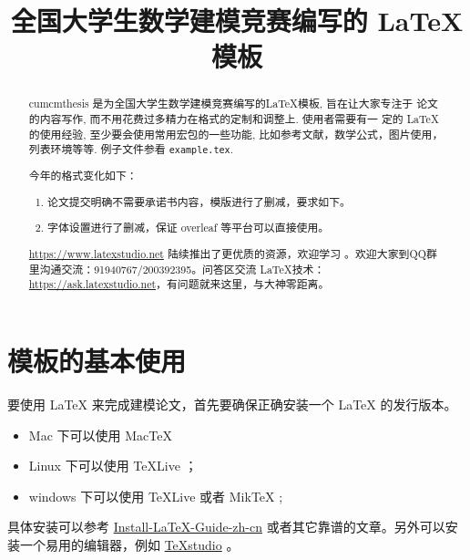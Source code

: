 \documentclass[withoutpreface,bwprint]{cumcmthesis} %
\title{全国大学生数学建模竞赛编写的 \LaTeX{} 模板}
\begin{document}
 \maketitle
 \begin{abstract}
cumcmthesis 是为全国大学生数学建模竞赛编写的\LaTeX{}模板, 旨在让大家专注于 论文的内容写作, 而不用花费过多精力在格式的定制和调整上.  使用者需要有一 定的 \LaTeX{} 的使用经验, 至少要会使用常用宏包的一些功能, 比如参考文献，数学公式，图片使用，列表环境等等. 例子文件参看 \texttt{example.tex}.

\begin{framee} 
 
今年的格式变化如下：
\begin{enumerate}
\item 论文提交明确不需要承诺书内容，模版进行了删减，要求如下。

\item 字体设置进行了删减，保证 overleaf 等平台可以直接使用。

\end{enumerate}

\end{framee}


\url{https://www.latexstudio.net} 陆续推出了更优质的资源，欢迎学习 。欢迎大家到QQ群里沟通交流：91940767/200392395。问答区交流 \LaTeX{}技术：\url{https://ask.latexstudio.net}，有问题就来这里，与大神零距离。

\end{abstract}



\section{模板的基本使用}

要使用 \LaTeX{} 来完成建模论文，首先要确保正确安装一个 \LaTeX{} 的发行版本。

\begin{itemize}
    \item Mac 下可以使用 Mac\TeX{}
    \item Linux 下可以使用 \TeX{}Live ；
    \item windows 下可以使用 \TeX{}Live 或者 Mik\TeX{} ;
\end{itemize}

具体安装可以参考 \href{https://github.com/OsbertWang/install-latex-guide-zh-cn/releases/}{Install-LaTeX-Guide-zh-cn} 或者其它靠谱的文章。另外可以安装一个易用的编辑器，例如 \href{https://mirrors.tuna.tsinghua.edu.cn/github-release/texstudio-org/texstudio/LatestRelease/}{\TeX{}studio} 。
\end{document}
